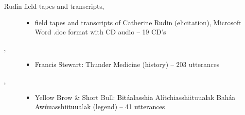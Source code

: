 \documentclass[output=paper]{LSP/langsci}
\begin{document}
\begin{description}
\item[Rudin field tapes and transcripts, ]\hfill
\begin{itemize}
\item field tapes and transcripts of Catherine Rudin (elicitation), Microsoft Word .doc format with CD audio -- 19 CD’s
\end{itemize}

\item[\citet{Wallace1993}, ]\hfill
\begin{itemize}
\item Francis Stewart: Thunder Medicine (history) -- 203 utterances
\end{itemize}

\item[\citet{YellowBrowShortBull1980}, ]\hfill
\begin{itemize}
\item Yellow Brow \& Short Bull: Bitáalasshia Alítchiasshiituualak Baháa Awúuasshiituualak (legend) -- 41 utterances
\end{itemize}

\end{description}

\printbibliography[heading=subbibliography,notkeyword=this]
\end{document}
